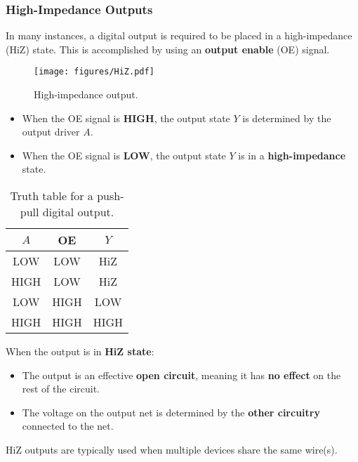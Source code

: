 \documentclass{article}
\begin{document}
\subsubsection{High-Impedance Outputs}
In many instances, a digital output is required to be placed in a
high-impedance (HiZ) state. This is accomplished by using an
\textbf{output enable} (OE) signal.
\begin{figure}[H]
    \centering
    \texttt{[image: figures/HiZ.pdf]}
    \caption{High-impedance output.} %
\end{figure}
\begin{itemize}
    \item When the OE signal is \textbf{HIGH}, the output state \(Y\)
          is determined by the output driver \(A\).
    \item When the OE signal is \textbf{LOW}, the output state \(Y\) is
          in a \textbf{high-impedance} state.
\end{itemize}
\begin{table}[H]
    \centering
    \begin{tabular}{c c | c}
        \toprule
        \textbf{\(A\)} & \textbf{OE} & \textbf{\(Y\)} \\
        \midrule
        LOW            & LOW         & HiZ            \\
        HIGH           & LOW         & HiZ            \\
        LOW            & HIGH        & LOW            \\
        HIGH           & HIGH        & HIGH           \\
        \bottomrule
    \end{tabular}
    \caption{Truth table for a push-pull digital output.} %
\end{table}
When the output is in \textbf{HiZ state}:
\begin{itemize}
    \item The output is an effective \textbf{open circuit}, meaning it
          has \textbf{no effect} on the rest of the circuit.
    \item The voltage on the output net is determined by the
          \textbf{other circuitry} connected to the net.
\end{itemize}
HiZ outputs are typically used when multiple devices share the same wire(s).
\end{document}
